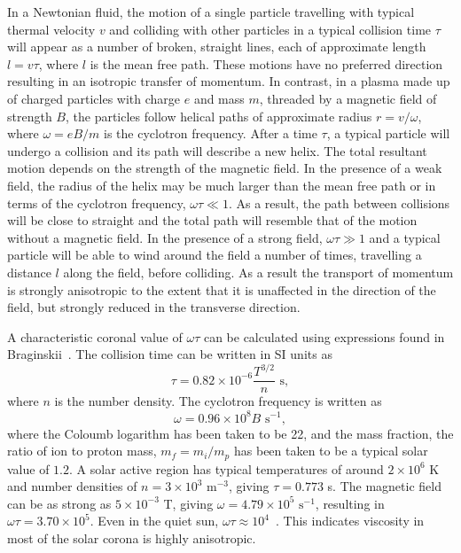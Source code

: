 In a Newtonian fluid, the motion of a single particle travelling with typical thermal velocity $v$ and colliding with other particles in a typical collision time $\tau$ will appear as a number of broken, straight lines, each of approximate length $l = v\tau$, where $l$ is the mean free path. These motions have no preferred direction resulting in an isotropic transfer of momentum. In contrast, in a plasma made up of charged particles with charge $e$ and mass $m$, threaded by a magnetic field of strength $B$, the particles follow helical paths of approximate radius $r = v/\omega$, where $\omega = eB/m$ is the cyclotron frequency. After a time $\tau$, a typical particle will undergo a collision and its path will describe a new helix. The total resultant motion depends on the strength of the magnetic field. In the presence of a weak field, the radius of the helix may be much larger than the mean free path or in terms of the cyclotron frequency, $\omega \tau \ll 1$. As a result, the path between collisions will be close to straight and the total path will resemble that of the motion without a magnetic field. In the presence of a strong field, $\omega \tau \gg 1$ and a typical particle will be able to wind around the field a number of times, travelling a distance $l$ along the field, before colliding. As a result the transport of momentum is strongly anisotropic to the extent that it is unaffected in the direction of the field, but strongly reduced in the transverse direction.

A characteristic coronal value of $\omega \tau$ can be calculated using expressions found in Braginskii~\cite{braginskiiTransportProcessesPlasma1965}. The collision time can be written in SI units as
\begin{equation}
  \label{eq:collision_time}
  \tau = 0.82 \times 10^{-6} \frac{T^{3/2}}{n} \text{ s},
\end{equation}
where $n$ is the number density. The cyclotron frequency is written as
\begin{equation}
  \label{eq:cyclotron_frequency}
  \omega = 0.96\times10^8 B \text{ s}^{-1},
\end{equation}
where the Coloumb logarithm has been taken to be 22, and the mass fraction, the ratio of ion to proton mass, $m_f = m_i/m_p$ has been taken to be a typical solar value of $1.2$. A solar active region has typical temperatures of around $2\times 10^6$ K and number densities of $n = 3 \times 10^3\text{ m}^{-3}$, giving $\tau = 0.773$ s. The magnetic field can be as strong as $5\times 10^{-3}$ T, giving $\omega = 4.79 \times 10^5 \text{ s}^{-1}$, resulting in $\omega \tau = 3.70 \times 10^5$. Even in the quiet sun, $\omega\tau \approx 10^4$~\cite{morganGlobalConditionsSolar2017}. This indicates viscosity in most of the solar corona is highly anisotropic. 

